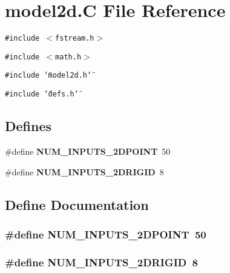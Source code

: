 \section{model2d.C File Reference}
\label{model2d_C}
{\tt \#include $<$fstream.h$>$}\par
{\tt \#include $<$math.h$>$}\par
{\tt \#include \char`\"{}model2d.h\char`\"{}}\par
{\tt \#include \char`\"{}defs.h\char`\"{}}\par
\subsection*{Defines}
\begin{CompactItemize}
\item 
\#define {\bf NUM\_\-INPUTS\_\-2DPOINT}\ 50
\item 
\#define {\bf NUM\_\-INPUTS\_\-2DRIGID}\ 8
\end{CompactItemize}


\subsection{Define Documentation}
\subsubsection{\setlength{\rightskip}{0pt plus 5cm}\#define NUM\_\-INPUTS\_\-2DPOINT\ 50}\label{model2d_C_a0}


\subsubsection{\setlength{\rightskip}{0pt plus 5cm}\#define NUM\_\-INPUTS\_\-2DRIGID\ 8}\label{model2d_C_a1}


